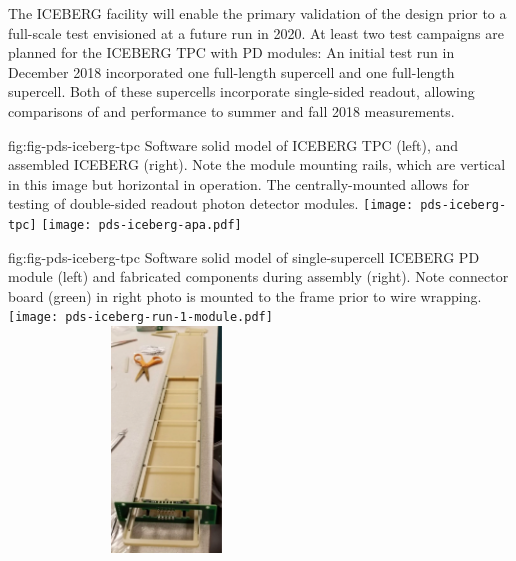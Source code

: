 The ICEBERG facility will enable the primary validation of the  design prior to a full-scale test envisioned at a future  run in 2020. 
At least two test campaigns are planned for the ICEBERG TPC with PD modules:  An initial test run in December 2018 incorporated one full-length  supercell and one full-length  supercell.  Both of these supercells incorporate single-sided readout, allowing comparisons of  and  performance to summer and fall 2018  measurements.


 \begin{dunefigure}
 {fig:fig-pds-iceberg-tpc}
 {Software solid model of ICEBERG TPC (left), and assembled ICEBERG  (right).  Note the  module mounting rails, which are vertical in this image but horizontal in operation. The centrally-mounted  allows for testing of double-sided readout photon detector modules.}
\texttt{[image: pds-iceberg-tpc]}
\texttt{[image: pds-iceberg-apa.pdf]}
\end{dunefigure}



\begin{dunefigure}
 {fig:fig-pds-iceberg-tpc}
 {Software solid model of single-supercell ICEBERG PD module (left) and fabricated components during assembly (right).  Note connector board (green) in right photo is mounted to the  frame prior to wire wrapping.}
\texttt{[image: pds-iceberg-run-1-module.pdf]}
\includegraphics[angle=0,width=8.4cm,height=6cm]{graphics/pds-iceberg-module-assembly-photo.pdf}
\end{dunefigure}

